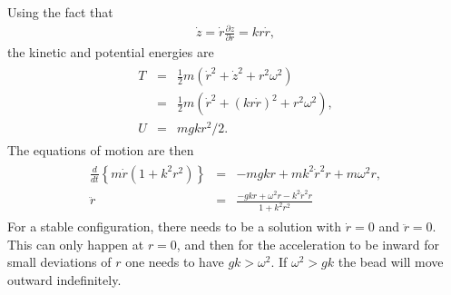 \documentclass[letterpaper,10pt,english]{sphinxmanual}
\begin{document}
Using the fact that
\begin{equation*}
\begin{split}
\dot{z}=\dot{r}\frac{\partial z}{\partial r}=kr\dot{r},
\end{split}
\end{equation*}
the kinetic and potential energies are
\begin{equation*}
\begin{split}
\begin{eqnarray*}
T&=&\frac{1}{2}m\left(\dot{r}^2+\dot{z}^2+r^2\omega^2\right)\\
&=&\frac{1}{2}m\left(\dot{r}^2+(kr\dot{r})^2+r^2\omega^2\right),\\
U&=&mgkr^2/2.
\end{eqnarray*}
\end{split}
\end{equation*}
The equations of motion are then
\begin{equation*}
\begin{split}
\begin{eqnarray*}
\frac{d}{dt}\left\{m\dot{r}(1+k^2r^2)\right\}&=&-mgkr+mk^2\dot{r}^2r+m\omega^2r,\\
\ddot{r}&=&\frac{-gkr+\omega^2r-k^2\dot{r}^2r}{1+k^2r^2}
\end{eqnarray*}
\end{split}
\end{equation*}
For a stable configuration, there needs to be a solution with
\(\dot{r}=0\) and \(\ddot{r}=0\). This can only happen at \(r=0\), and then
for the acceleration to be inward for small deviations of \(r\) one
needs to have \(gk>\omega^2\). If \(\omega^2>gk\) the bead will move
outward indefinitely.
\end{document}
